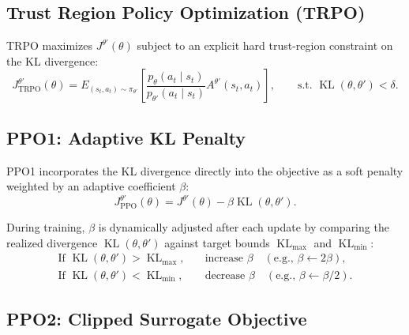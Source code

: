 \documentclass[11pt, a4paper]{article}
\begin{document}
\subsection*{Trust Region Policy Optimization (TRPO)}

TRPO maximizes $J^{\theta'}(\theta)$ subject to an explicit hard trust-region constraint on the KL divergence:
\begin{equation}\label{eq:ppo-trpo-objective}
    J_{\text{TRPO}}^{\theta'}(\theta) = E_{(s_t, a_t) \sim \pi_{\theta'}}\left[\frac{p_\theta(a_t \mid s_t)}{p_{\theta'}(a_t \mid s_t)} A^{\theta'}(s_t, a_t)\right], \qquad \text{s.t. } \operatorname{KL}(\theta, \theta') < \delta.
\end{equation}

\subsection*{PPO1: Adaptive KL Penalty}

PPO1 incorporates the KL divergence directly into the objective as a soft penalty weighted by an adaptive coefficient $\beta$:
\begin{equation}\label{eq:ppo-kl-penalty-objective}
    J_{\text{PPO}}^{\theta'}(\theta) = J^{\theta'}(\theta) - \beta \operatorname{KL}(\theta, \theta').
\end{equation}

During training, $\beta$ is dynamically adjusted after each update by comparing the realized divergence $\operatorname{KL}(\theta, \theta')$ against target bounds $\operatorname{KL}_{\max}$ and $\operatorname{KL}_{\min}$:
\begin{align}
    \text{If } \operatorname{KL}(\theta, \theta') > \operatorname{KL}_{\max}, \quad &\text{increase } \beta \quad (\text{e.g., } \beta \leftarrow 2\beta),\label{eq:ppo-increase-penalty} \\
    \text{If } \operatorname{KL}(\theta, \theta') < \operatorname{KL}_{\min}, \quad &\text{decrease } \beta \quad (\text{e.g., } \beta \leftarrow \beta / 2).\label{eq:ppo-decrease-penalty}
\end{align}

\subsection*{PPO2: Clipped Surrogate Objective}
\end{document}
